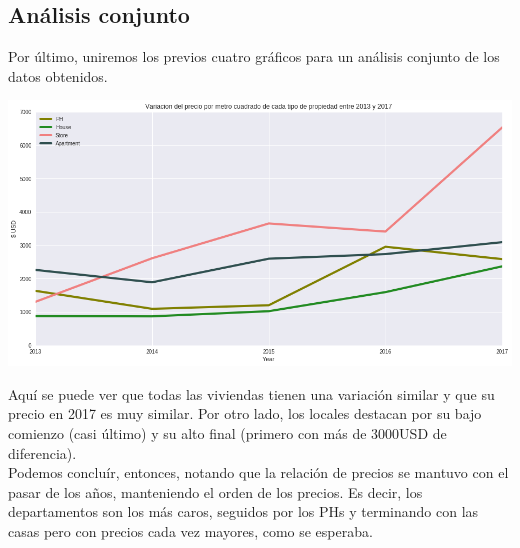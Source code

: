 \documentclass[a4paper, 10pt]{article}
\newcommand\tab[1][0.5cm]{\hspace*{#1}}
\begin{document}
			\subsection{Análisis conjunto}
				Por último, uniremos los previos cuatro gráficos para un análisis conjunto de los datos obtenidos.
				\begin{center}
   		    			\includegraphics[width=\textwidth]{images/jointVariation}
				\end{center}
				\tab Aquí se puede ver que todas las viviendas tienen una variación similar y que su precio en 2017 es muy similar.
				Por otro lado, los locales destacan por su bajo comienzo (casi último) y su alto final (primero con más de $3000$USD
				de diferencia). \\
				\tab Podemos concluír, entonces, notando que la relación de precios se mantuvo con el pasar de los años, manteniendo
				el orden de los precios. Es decir, los departamentos son los más caros, seguidos por los PHs y terminando con
				las casas pero con precios cada vez mayores, como se esperaba.
\end{document}
